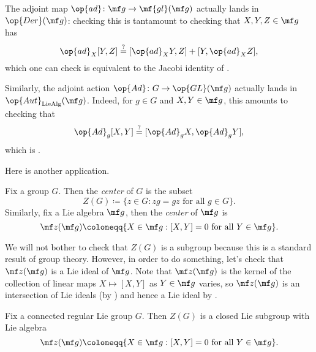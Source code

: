 \documentclass[../notes.tex]{subfiles}
\begin{document}
\begin{remark}
	The adjoint map $\op{ad}\colon\mf g\to\mf{gl}(\mf g)$ actually lands in $\op{Der}(\mf g)$: checking this is tantamount to checking that $X,Y,Z\in\mf g$ has
	\[\op{ad}_X[Y,Z]\stackrel?=[\op{ad}_XY,Z]+[Y,\op{ad}_XZ],\]
	which one can check is equivalent to the Jacobi identity of .
\end{remark}
\begin{remark}
	Similarly, the adjoint action $\op{Ad}\colon G\to\op{GL}(\mf g)$ actually lands in $\op{Aut}_{\mathrm{LieAlg}}(\mf g)$. Indeed, for $g\in G$ and $X,Y\in\mf g$, this amounts to checking that
	\[\op{Ad}_g[X,Y]\stackrel?=[\op{Ad}_gX,\op{Ad}_gY],\]
	which is .
\end{remark}
Here is another application.
\begin{definition}[center]
	Fix a group $G$. Then the \textit{center} of $G$ is the subset
	\[Z(G)\coloneqq\{z\in G:zg=gz\text{ for all }g\in G\}.\]
	Similarly, fix a Lie algebra $\mf g$, then the \textit{center} of $\mf g$ is
	\[\mf z(\mf g)\coloneqq\{X\in\mf g:[X,Y]=0\text{ for all }Y\in\mf g\}.\]
\end{definition}
\begin{remark}
	We will not bother to check that $Z(G)$ is a subgroup because this is a standard result of group theory. However, in order to do something, let's check that $\mf z(\mf g)$ is a Lie ideal of $\mf g$. Note that $\mf z(\mf g)$ is the kernel of the collection of linear maps $X\mapsto[X,Y]$ as $Y\in\mf g$ varies, so $\mf z(\mf g)$ is an intersection of Lie ideals (by ) and hence a Lie ideal by .
\end{remark}
\begin{proposition}
	Fix a connected regular Lie group $G$. Then $Z(G)$ is a closed Lie subgroup with Lie algebra
	\[\mf z(\mf g)\coloneqq\{X\in\mf g:[X,Y]=0\text{ for all }Y\in\mf g\}.\]
\end{proposition}
\end{document}
